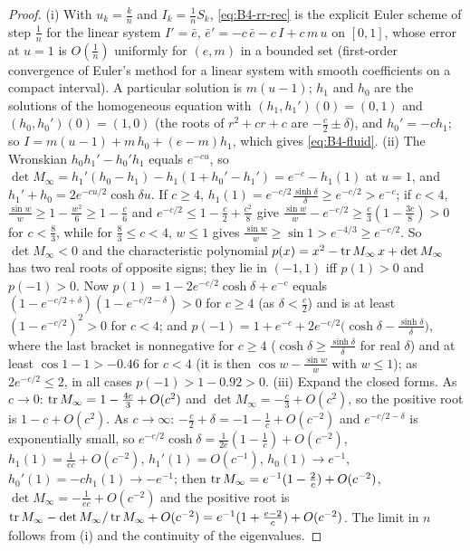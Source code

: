 \begin{proof}
(i) With $u_k=\frac kn$ and $I_k=\frac1nS_k$, \eqref{eq:B4-rr-rec} is the explicit Euler scheme of step $\frac1n$ for the linear system $I'=\bar e$, $\bar e'=-c\,\bar e-c\,I+c\,m\,u$ on $[0,1]$, whose error at $u=1$ is $O(\frac1n)$ uniformly for $(e,m)$ in a bounded set (first-order convergence of Euler's method for a linear system with smooth coefficients on a compact interval). A particular solution is $m(u-1)$; $h_1$ and $h_0$ are the solutions of the homogeneous equation with $(h_1,h_1')(0)=(0,1)$ and $(h_0,h_0')(0)=(1,0)$ (the roots of $r^2+cr+c$ are $-\frac c2\pm\delta$), and $h_0'=-ch_1$; so $I=m(u-1)+m\,h_0+(e-m)h_1$, which gives \eqref{eq:B4-fluid}.
(ii) The Wronskian $h_0h_1'-h_0'h_1$ equals $e^{-cu}$, so $\det M_\infty=h_1'(h_0-h_1)-h_1(1+h_0'-h_1')=e^{-c}-h_1(1)$ at $u=1$, and $h_1'+h_0=2e^{-cu/2}\cosh\delta u$. If $c\ge4$, $h_1(1)=e^{-c/2}\frac{\sinh\delta}\delta\ge e^{-c/2}>e^{-c}$; if $c<4$, $\frac{\sin w}w\ge1-\frac{w^2}6\ge1-\frac c6$ and $e^{-c/2}\le1-\frac c2+\frac{c^2}8$ give $\frac{\sin w}w-e^{-c/2}\ge\frac c3(1-\frac{3c}8)>0$ for $c<\frac83$, while for $\frac83\le c<4$, $w\le1$ gives $\frac{\sin w}w\ge\sin1>e^{-4/3}\ge e^{-c/2}$. So $\det M_\infty<0$ and the characteristic polynomial $p(x)=x^2-\operatorname{tr} M_\infty\,x+\det M_\infty$ has two real roots of opposite signs; they lie in $(-1,1)$ iff $p(1)>0$ and $p(-1)>0$. Now $p(1)=1-2e^{-c/2}\cosh\delta+e^{-c}$ equals $(1-e^{-c/2+\delta})(1-e^{-c/2-\delta})>0$ for $c\ge4$ (as $\delta<\frac c2$) and is at least $(1-e^{-c/2})^2>0$ for $c<4$; and $p(-1)=1+e^{-c}+2e^{-c/2}\big(\cosh\delta-\frac{\sinh\delta}\delta\big)$, where the last bracket is nonnegative for $c\ge4$ ($\cosh\delta\ge\frac{\sinh\delta}\delta$ for real $\delta$) and at least $\cos1-1>-0.46$ for $c<4$ (it is then $\cos w-\frac{\sin w}w$ with $w\le1$); as $2e^{-c/2}\le2$, in all cases $p(-1)>1-0.92>0$.
(iii) Expand the closed forms. As $c\to0$: $\operatorname{tr} M_\infty=1-\frac{4c}3+O(c^2)$ and $\det M_\infty=-\frac c3+O(c^2)$, so the positive root is $1-c+O(c^2)$. As $c\to\infty$: $-\frac c2+\delta=-1-\frac1c+O(c^{-2})$ and $e^{-c/2-\delta}$ is exponentially small, so $e^{-c/2}\cosh\delta=\frac1{2e}(1-\frac1c)+O(c^{-2})$, $h_1(1)=\frac1{ec}+O(c^{-2})$, $h_1'(1)=O(c^{-1})$, $h_0(1)\to e^{-1}$, $h_0'(1)=-ch_1(1)\to-e^{-1}$; then $\operatorname{tr} M_\infty=e^{-1}(1-\frac2c)+O(c^{-2})$, $\det M_\infty=-\frac1{ec}+O(c^{-2})$ and the positive root is $\operatorname{tr} M_\infty-\det M_\infty/\operatorname{tr} M_\infty+O(c^{-2})=e^{-1}(1+\frac{e-2}c)+O(c^{-2})$. The limit in $n$ follows from (i) and the continuity of the eigenvalues.
\end{proof}

